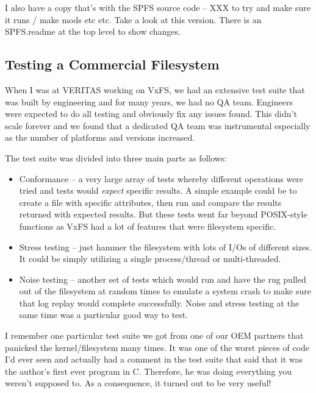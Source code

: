 \noindent
I also have a copy that's with the SPFS source code -- XXX to try and make sure it runs / make mods etc etc. Take a look at this version. There is an SPFS.readme at the top level to show changes.


\subsection{Testing a Commercial Filesystem}

When I was at VERITAS working on VxFS, we had an extensive test suite that was built by engineering and for many years, we had no QA team. Engineers were expected to do all testing and obviously fix any issues found. This didn't scale forever and we found that a dedicated QA team was instrumental especially as the number of platforms and versions increased.

The test suite was divided into three main parts as follows:

\begin{itemize}
	\item Conformance -- a very large array of tests whereby different operations were tried and tests would \textit{expect}
		specific results. A simple example could be to create a file with specific attributes, then run  and 
		compare the results returned with expected results. But these tests went far beyond POSIX-style functions as
		VxFS had a lot of features that were filesystem specific.
	\item Stress testing -- just hammer the filesystem with lots of I/Os of different sizes. It could be simply utilizing a single
		process/thread or multi-threaded.
	\item Noise testing -- another set of tests which would run and have the rug pulled out of the filesystem at random times
		to emulate a system crash to make sure that log replay would complete successfully. Noise and stress testing at the 
		same time was a particular good way to test.
\end{itemize}

\noindent
I remember one particular test suite we got from one of our OEM partners that panicked the kernel/filesystem many times. It was one of the worst pieces of code I'd ever seen and actually had a comment in the test suite that said that it was the author's first ever program in C. Therefore, he was doing everything you weren't supposed to. As a consequence, it turned out to be very useful!

